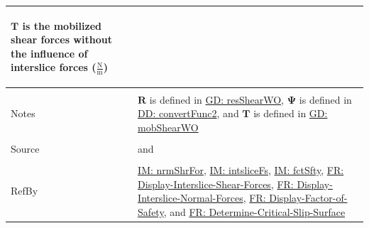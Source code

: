 \documentclass[12pt]{article}
\begin{document}
\begin{minipage}{\textwidth}
\begin{tabular}{>{\raggedright}p{}>{\raggedright\arraybackslash}p{}}
\begin{symbDescription}
                        \item{$\mathbf{T}$ is the mobilized shear forces without the influence of interslice forces ($\frac{\text{N}}{\text{m}}$)}
                        \end{symbDescription}
          \\ \midrule \\
          Notes & $\mathbf{R}$ is defined in \hyperref[GD:resShearWO]{GD: resShearWO}, $\mathbf{Ψ}$ is defined in \hyperref[DD:convertFunc2]{DD: convertFunc2}, and $\mathbf{T}$ is defined in \hyperref[GD:mobShearWO]{GD: mobShearWO}
          \\ \midrule \\
          Source & \cite{chen2005} and \cite{karchewski2012}
          \\ \midrule \\
          RefBy & \hyperref[IM:nrmShrFor]{IM: nrmShrFor}, \hyperref[IM:intsliceFs]{IM: intsliceFs}, \hyperref[IM:fctSfty]{IM: fctSfty}, \hyperref[displayShear]{FR: Display-Interslice-Shear-Forces}, \hyperref[displayNormal]{FR: Display-Interslice-Normal-Forces}, \hyperref[displayFS]{FR: Display-Factor-of-Safety}, and \hyperref[determineCritSlip]{FR: Determine-Critical-Slip-Surface}
          \\ \bottomrule
          \end{tabular}
          \end{minipage}
\end{document}
